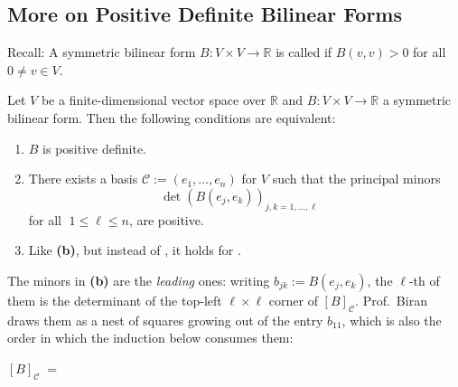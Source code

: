 \subsection{More on Positive Definite Bilinear Forms}

Recall: A symmetric bilinear form $B \colon V \times V \to \mathbb{R}$ is called  if $B(v, v) > 0$ for all $0 \neq v \in V$.

\begin{theorem}
\label{thm:sylvesters_criterion}
Let $V$ be a finite-dimensional vector space over $\mathbb{R}$ and $B \colon V \times V \to \mathbb{R}$ a symmetric bilinear form. Then the following conditions are equivalent:
\begin{enumerate}[label=\textbf{(\alph*)}]
    \item $B$ is positive definite.
    \item There exists a basis $\mathcal{C} := (e_1, \dots, e_n)$ for $V$ such that the principal minors 
    \[ 
    \det(B(e_j, e_k))_{j,k=1, \dots, \ell} \quad 
    \]
    for all $\; 1 \le \ell \le n$, are positive.
    \item Like \textbf{(b)}, but instead of , it holds for .
\end{enumerate}
\end{theorem}

The minors in \textbf{(b)} are the \emph{leading} ones: writing $b_{jk} := B(e_j, e_k)$, the $\ell$-th of them is the determinant of the top-left $\ell \times \ell$ corner of $[B]_{\mathcal{C}}$. Prof.~Biran draws them as a nest of squares growing out of the entry $b_{11}$, which is also the order in which the induction below consumes them:

\begin{center}
$[B]_{\mathcal{C}} \;=\;$
\end{center}


